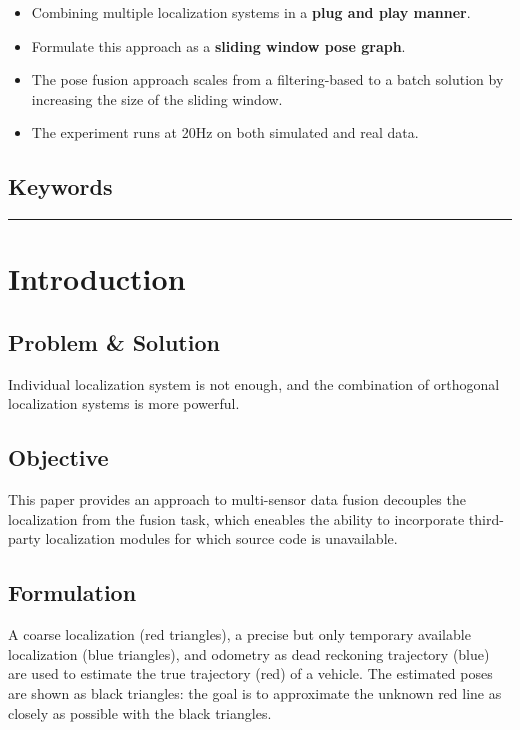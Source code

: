 \documentclass[letterpaper,10pt]{article}
\begin{document}
\begin{itemize}
	\item Combining multiple localization systems in a \textbf{plug and play manner}.
	\item Formulate this approach as a \textbf{sliding window pose graph}.
	\item The pose fusion approach scales from a filtering-based to a batch solution by increasing the size of the sliding window.
	\item The experiment runs at 20Hz on both simulated and real data.
\end{itemize}

\subsection{Keywords}

\begin{center}\rule{\textwidth}{1pt}\end{center}
\section{Introduction}

\subsection{Problem \& Solution}

Individual localization system is not enough, and the combination of orthogonal localization systems is more powerful.

\subsection{Objective}

This paper provides an approach to multi-sensor data fusion decouples the localization from the fusion task, which eneables the ability to incorporate third-party localization modules for which source code is unavailable.

\subsection{Formulation}

A coarse localization (red triangles), a precise but only temporary available localization (blue triangles), and odometry as dead reckoning trajectory (blue) are used to estimate the true trajectory (red) of a vehicle. The estimated poses are shown as black triangles: the goal is to approximate the unknown red line as closely as possible with the black triangles.
\end{document}
